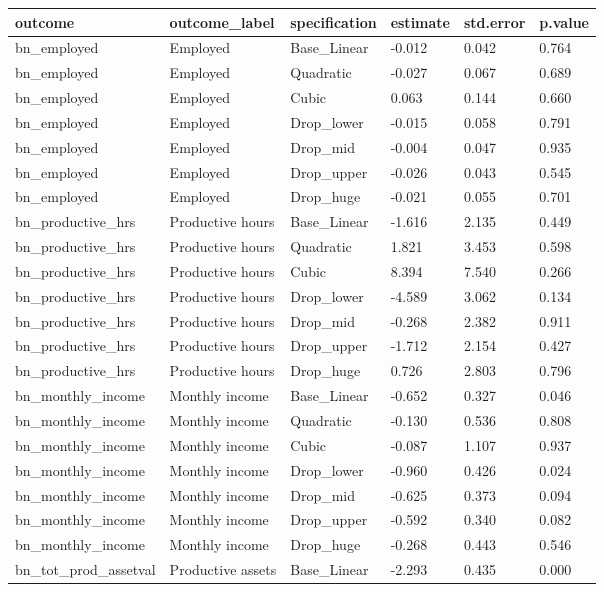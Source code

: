\begin{tabular}{llllll}
\toprule
outcome & outcome\_label & specification & estimate & std.error & p.value
 \\
\midrule
bn\_employed & Employed & Base\_Linear & -0.012 & 0.042 & 0.764 \\
bn\_employed & Employed & Quadratic & -0.027 & 0.067 & 0.689 \\
bn\_employed & Employed & Cubic & 0.063 & 0.144 & 0.660 \\
bn\_employed & Employed & Drop\_lower & -0.015 & 0.058 & 0.791 \\
bn\_employed & Employed & Drop\_mid & -0.004 & 0.047 & 0.935 \\
bn\_employed & Employed & Drop\_upper & -0.026 & 0.043 & 0.545 \\
bn\_employed & Employed & Drop\_huge & -0.021 & 0.055 & 0.701 \\
bn\_productive\_hrs & Productive hours & Base\_Linear & -1.616 & 2.135 & 0.449 \\
bn\_productive\_hrs & Productive hours & Quadratic & 1.821 & 3.453 & 0.598 \\
bn\_productive\_hrs & Productive hours & Cubic & 8.394 & 7.540 & 0.266 \\
bn\_productive\_hrs & Productive hours & Drop\_lower & -4.589 & 3.062 & 0.134 \\
bn\_productive\_hrs & Productive hours & Drop\_mid & -0.268 & 2.382 & 0.911 \\
bn\_productive\_hrs & Productive hours & Drop\_upper & -1.712 & 2.154 & 0.427 \\
bn\_productive\_hrs & Productive hours & Drop\_huge & 0.726 & 2.803 & 0.796 \\
bn\_monthly\_income & Monthly income & Base\_Linear & -0.652 & 0.327 & 0.046 \\
bn\_monthly\_income & Monthly income & Quadratic & -0.130 & 0.536 & 0.808 \\
bn\_monthly\_income & Monthly income & Cubic & -0.087 & 1.107 & 0.937 \\
bn\_monthly\_income & Monthly income & Drop\_lower & -0.960 & 0.426 & 0.024 \\
bn\_monthly\_income & Monthly income & Drop\_mid & -0.625 & 0.373 & 0.094 \\
bn\_monthly\_income & Monthly income & Drop\_upper & -0.592 & 0.340 & 0.082 \\
bn\_monthly\_income & Monthly income & Drop\_huge & -0.268 & 0.443 & 0.546 \\
bn\_tot\_prod\_assetval & Productive assets & Base\_Linear & -2.293 & 0.435 & 0.000 \\

\end{tabular}
